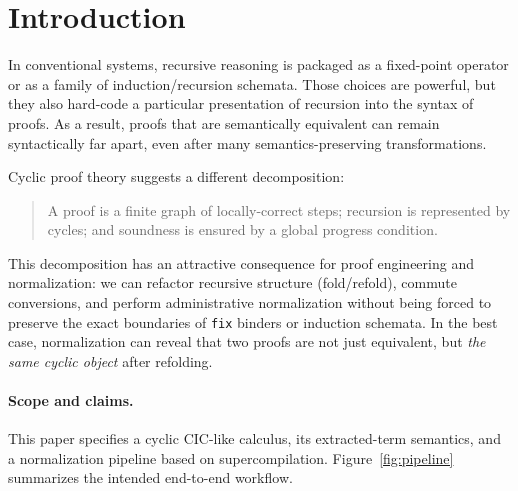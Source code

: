 \section{Introduction}

In conventional systems, recursive reasoning is packaged as a fixed-point operator or as a family of induction/recursion schemata.
Those choices are powerful, but they also hard-code a particular presentation of recursion into the syntax of proofs.
As a result, proofs that are semantically equivalent can remain syntactically far apart, even after many semantics-preserving transformations.

Cyclic proof theory suggests a different decomposition:
\begin{quote}
A proof is a finite graph of locally-correct steps; recursion is represented by cycles; and soundness is ensured by a global progress condition.
\end{quote}

This decomposition has an attractive consequence for proof engineering and normalization:
we can refactor recursive structure (fold/refold), commute conversions, and perform administrative normalization without being forced to preserve the exact boundaries of \texttt{fix} binders or induction schemata.
In the best case, normalization can reveal that two proofs are not just equivalent, but \emph{the same cyclic object} after refolding.

\paragraph{Scope and claims.}
This paper specifies a cyclic CIC-like calculus, its extracted-term semantics, and a normalization pipeline based on supercompilation.
Figure~\ref{fig:pipeline} summarizes the intended end-to-end workflow.

